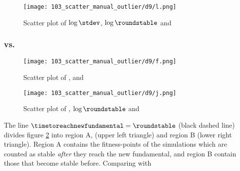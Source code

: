 \begin{figure}
\centering
\texttt{[image: 103\_scatter\_manual\_outlier/d9/l.png]}
\caption{Scatter plot of $\log \stdev$, $\log \roundstable$ and \overshoot}
\label{figure:d9_scatter_fitness_inliers_logs_logr_o}
\end{figure}



\subsubsection{\roundstable vs. \timetoreachnewfundamental}
\begin{figure}
\centering
\texttt{[image: 103\_scatter\_manual\_outlier/d9/f.png]}
\caption{Scatter plot of \roundstable, \timetoreachnewfundamental and \stdev}
\label{figure:d9_scatter_fitness_inliers_t_r_logs}
\end{figure}
\begin{figure}
\centering
\texttt{[image: 103\_scatter\_manual\_outlier/d9/j.png]}
\caption{Scatter plot of \overshoot, $\log \roundstable$ and \timetoreachnewfundamental}
\label{figure:d9_scatter_fitness_inliers_t_r_o}
\end{figure}

The line $\timetoreachnewfundamental = \roundstable$ (black dashed line) divides figure \ref{figure:d9_scatter_fitness_inliers_t_r_logs} into region A, (upper left triangle) and region B (lower right triangle). Region A contains the fitness-points of the simulations which are counted as stable \textit{after} they reach the new fundamental, and region B contain those that become stable before. Comparing with 



